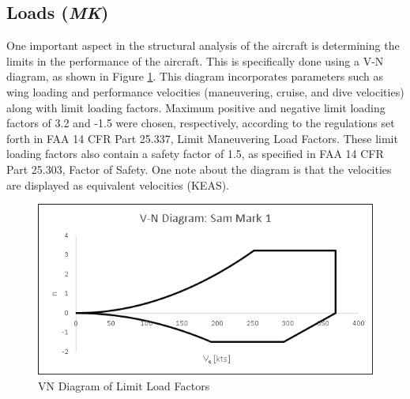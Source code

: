 \subsection{Loads (\textit{MK})}

One important aspect in the structural analysis of the aircraft is determining the limits in the performance of the aircraft. This is specifically done using a V-N diagram, as shown in Figure \ref{figVN}. This diagram incorporates parameters such as wing loading and performance velocities (maneuvering, cruise, and dive velocities) along with limit loading factors. Maximum positive and negative limit loading factors of 3.2 and -1.5 were chosen, respectively, according to the regulations set forth in FAA 14 CFR Part 25.337, Limit Maneuvering Load Factors. These limit loading factors also contain a safety factor of 1.5, as specified in FAA 14 CFR Part 25.303, Factor of Safety. One note about the diagram is that the velocities are displayed as equivalent velocities (KEAS).

\begin{figure}[H]
    \centering
    \includegraphics[width=\linewidth]{Photos/VN_Diagram_(2-11-20).png}
    \caption{VN Diagram of Limit Load Factors}
    \label{figVN}
\end{figure}




